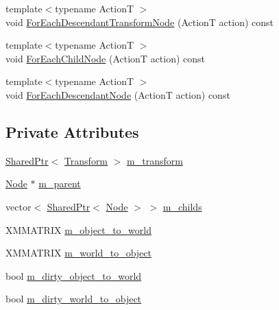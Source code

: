 \begin{DoxyCompactItemize}
\item 
{\footnotesize template$<$typename ActionT $>$ }\\void \hyperlink{structmage_1_1_transform_node_a7a052715d9591defa06e494017539711}{For\+Each\+Descendant\+Transform\+Node} (ActionT action) const
\item 
{\footnotesize template$<$typename ActionT $>$ }\\void \hyperlink{structmage_1_1_transform_node_a3dd36b373d27e3526df562ba899f721f}{For\+Each\+Child\+Node} (ActionT action) const
\item 
{\footnotesize template$<$typename ActionT $>$ }\\void \hyperlink{structmage_1_1_transform_node_a696d23bd936d3c3f880cb8b5cfd54d80}{For\+Each\+Descendant\+Node} (ActionT action) const
\end{DoxyCompactItemize}
\subsection*{Private Attributes}
\begin{DoxyCompactItemize}
\item 
\hyperlink{namespacemage_a1e01ae66713838a7a67d30e44c67703e}{Shared\+Ptr}$<$ \hyperlink{structmage_1_1_transform}{Transform} $>$ \hyperlink{structmage_1_1_transform_node_a648c4757ba4d10e7749217077d11475d}{m\+\_\+transform}
\item 
\hyperlink{classmage_1_1_node}{Node} $\ast$ \hyperlink{structmage_1_1_transform_node_afad4b8198a5e4b1a3c46fb8e51fd17c2}{m\+\_\+parent}
\item 
vector$<$ \hyperlink{namespacemage_a1e01ae66713838a7a67d30e44c67703e}{Shared\+Ptr}$<$ \hyperlink{classmage_1_1_node}{Node} $>$ $>$ \hyperlink{structmage_1_1_transform_node_ae26b5d4c920a3743354b6f28c8b41651}{m\+\_\+childs}
\item 
X\+M\+M\+A\+T\+R\+IX \hyperlink{structmage_1_1_transform_node_a79de447d6d40226d7ceb276007f5fbeb}{m\+\_\+object\+\_\+to\+\_\+world}
\item 
X\+M\+M\+A\+T\+R\+IX \hyperlink{structmage_1_1_transform_node_ade413fc9a980ce8e1191c17f94f25e3f}{m\+\_\+world\+\_\+to\+\_\+object}
\item 
bool \hyperlink{structmage_1_1_transform_node_a389151fddc72499d0be4e725622d99b9}{m\+\_\+dirty\+\_\+object\+\_\+to\+\_\+world}
\item 
bool \hyperlink{structmage_1_1_transform_node_acb9046e0096ada337e1978f016daa144}{m\+\_\+dirty\+\_\+world\+\_\+to\+\_\+object}
\end{DoxyCompactItemize}
